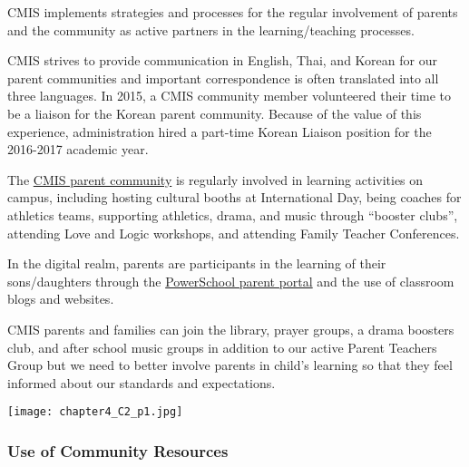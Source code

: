

\begin{findings}
CMIS implements strategies and processes for the regular involvement of parents and the community as active partners in the learning/teaching processes.

CMIS strives to provide communication in English, Thai, and Korean for our parent communities and important correspondence is often translated into all three languages.  In 2015, a CMIS community member volunteered their time to be a liaison for the Korean parent community.  Because of the value of this experience, administration hired a part-time Korean Liaison position for the 2016-2017 academic year.

The \href{http://blogs.cmis.ac.th/ptg/}{CMIS parent community} is regularly involved in learning activities on campus, including hosting cultural booths at International Day, being coaches for athletics teams, supporting athletics, drama, and music through “booster clubs”, attending Love and Logic workshops, and attending Family Teacher Conferences.

In the digital realm, parents are participants in the learning of their sons/daughters through the \href{https://cmis.powerschool.com/public/}{PowerSchool parent portal} and the use of classroom blogs and websites.


CMIS parents and families can join the library, prayer groups, a drama boosters club, and after school music groups in addition to our active Parent Teachers Group but we need to better involve parents in child’s learning so that they feel informed about our standards and expectations.
\end{findings}

{\centering\texttt{[image: chapter4\_C2\_p1.jpg]}}

\subsubsection{Use of Community Resources}

